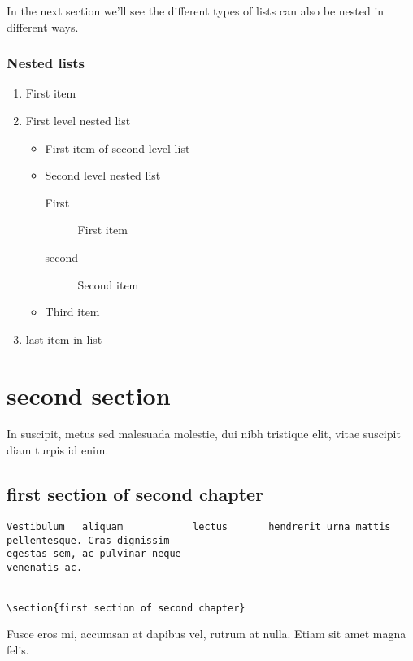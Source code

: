 \documentclass[a4paper]{report}
\begin{document}
In the next section we'll see the different types of lists can also be nested
in different ways.


\subsection{Nested lists}

\begin{enumerate}
    \item First item
    \item First level nested list
    \begin{itemize}
        \item First item of second level list
        \item Second level nested list
        \begin{description}
            \item[First] First item
            \item[second] Second item
        \end{description}
        \item Third item
    \end{itemize}
    \item last item in list
\end{enumerate}


\chapter{second section}

In suscipit, metus sed malesuada molestie, dui nibh tristique elit, vitae
suscipit diam turpis id enim.


\section{first section of second chapter}

\begin{verbatim}
Vestibulum   aliquam            lectus       hendrerit urna mattis pellentesque. Cras dignissim
egestas sem, ac pulvinar neque
venenatis ac.


\section{first section of second chapter}

\end{verbatim}

Fusce eros mi, accumsan at dapibus vel, rutrum at nulla. Etiam sit amet magna
felis.
\end{document}
